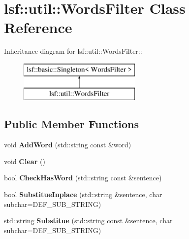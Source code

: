 \hypertarget{classlsf_1_1util_1_1WordsFilter}{
\section{lsf::util::WordsFilter Class Reference}
\label{classlsf_1_1util_1_1WordsFilter}
}
Inheritance diagram for lsf::util::WordsFilter::\begin{figure}[H]
\begin{center}
\leavevmode
\includegraphics[height=2cm]{classlsf_1_1util_1_1WordsFilter}
\end{center}
\end{figure}
\subsection*{Public Member Functions}
\begin{DoxyCompactItemize}
\item 
\hypertarget{classlsf_1_1util_1_1WordsFilter_a84a4bd9b6cae3dc36029951e23401766}{
void {\bfseries AddWord} (std::string const \&word)}
\label{classlsf_1_1util_1_1WordsFilter_a84a4bd9b6cae3dc36029951e23401766}

\item 
\hypertarget{classlsf_1_1util_1_1WordsFilter_ad591d039cc5be8c5e9cb6cf5ecfc00bd}{
void {\bfseries Clear} ()}
\label{classlsf_1_1util_1_1WordsFilter_ad591d039cc5be8c5e9cb6cf5ecfc00bd}

\item 
\hypertarget{classlsf_1_1util_1_1WordsFilter_a075bbaa2f7ac0e150f7b426cabffd372}{
bool {\bfseries CheckHasWord} (std::string const \&sentence)}
\label{classlsf_1_1util_1_1WordsFilter_a075bbaa2f7ac0e150f7b426cabffd372}

\item 
\hypertarget{classlsf_1_1util_1_1WordsFilter_a5e0f58d35d9aa7fd423f547069219d53}{
bool {\bfseries SubstitueInplace} (std::string \&sentence, char subchar=DEF\_\-SUB\_\-STRING)}
\label{classlsf_1_1util_1_1WordsFilter_a5e0f58d35d9aa7fd423f547069219d53}

\item 
\hypertarget{classlsf_1_1util_1_1WordsFilter_a27945859efe23b9af4709fd5ebcc7a5c}{
std::string {\bfseries Substitue} (std::string const \&sentence, char subchar=DEF\_\-SUB\_\-STRING)}
\label{classlsf_1_1util_1_1WordsFilter_a27945859efe23b9af4709fd5ebcc7a5c}

\end{DoxyCompactItemize}
